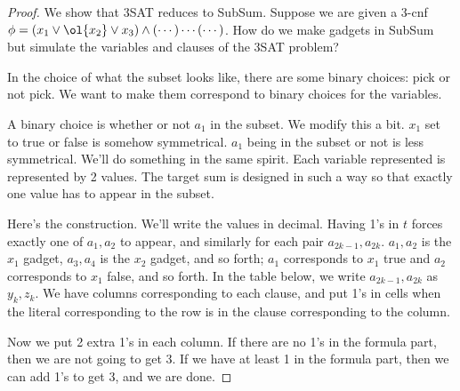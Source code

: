 \begin{proof}
We show that 3SAT reduces to SubSum. Suppose we are given a 3-cnf $\phi=(x_1\vee \ol{x_2}\vee {x_3})\wedge (\cdots)\cdots (\cdots)$. How do we make gadgets in SubSum but simulate the variables and clauses of the 3SAT problem?

In the choice of what the subset looks like, there are some binary choices: pick or not pick. We want to make them correspond to binary choices for the variables. 

A binary choice is whether or not $a_1$ in the subset. We modify this a bit. $x_1$ set to true or false is somehow symmetrical. $a_1$ being in the subset or not is less symmetrical. We'll do something in the same spirit. Each variable represented is represented by 2 values. The target sum is designed in such a way so that exactly one value has to appear in the subset.

Here's the construction. %
We'll write the values in decimal.  Having 1's in $t$ forces exactly one of $a_1,a_2$ to appear, and similarly for each pair $a_{2k-1},a_{2k}$. $a_1,a_2$ is the $x_1$ gadget, $a_3,a_4$ is the $x_2$ gadget, and so forth; $a_1$ corresponds to $x_1$ true and $a_2$ corresponds to $x_1$ false, and so forth. In the table below, we write $a_{2k-1},a_{2k}$ as $y_k,z_k$. We have columns corresponding to each clause, and put 1's in cells when the literal corresponding to the row is in the clause corresponding to the column.


Now we put 2 extra 1's in each column. If there are no 1's in the  formula part, then we are not going to get 3. If we have at least 1 in the formula part, then we can add 1's to get 3, and we are done.
\end{proof}